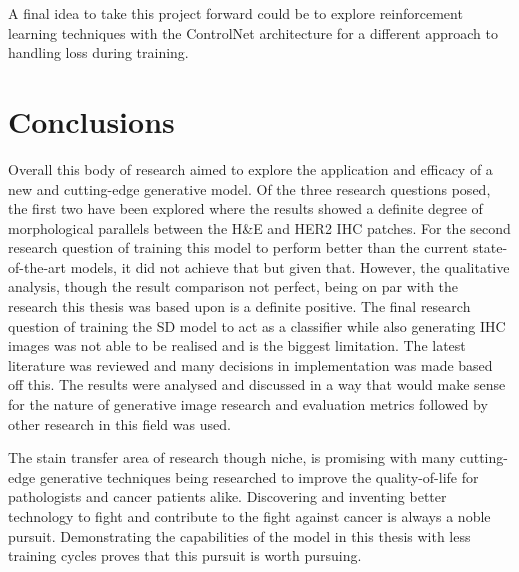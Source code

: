 A final idea to take this project forward could be to explore reinforcement learning techniques with the ControlNet architecture for a different approach to handling loss during training.

\section{Conclusions}

Overall this body of research aimed to explore the application and efficacy of a new and cutting-edge generative model. Of the three research questions posed, the first two have been explored where the results showed a definite degree of morphological parallels between the H\&E and HER2 IHC patches. For the second research question of training this model to perform better than the current state-of-the-art models, it did not achieve that but given that. However, the qualitative analysis, though the result comparison not perfect, being on par with the research this thesis was based upon is a definite positive. The final research question of training the SD model to act as a classifier while also generating IHC images was not able to be realised and is the biggest limitation. The latest literature was reviewed and many decisions in implementation was made based off this. The results were analysed and discussed in a way that would make sense for the nature of generative image research and evaluation metrics followed by other research in this field was used.

The stain transfer area of research though niche, is promising with many cutting-edge generative techniques being researched to improve the quality-of-life for pathologists and cancer patients alike. Discovering and inventing better technology to fight and contribute to the fight against cancer is always a noble pursuit. Demonstrating the capabilities of the model in this thesis with less training cycles proves that this pursuit is worth pursuing. 


